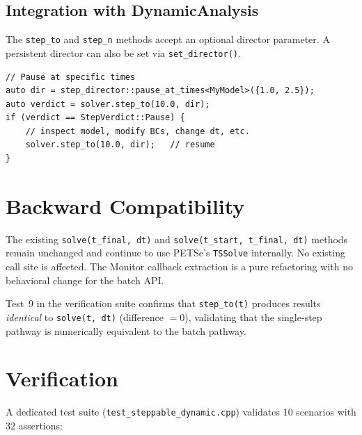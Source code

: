 \subsection{Integration with DynamicAnalysis}

The \texttt{step\_to} and \texttt{step\_n} methods accept an optional
director parameter.  A persistent director can also be set via
\texttt{set\_director()}.

\begin{lstlisting}
// Pause at specific times
auto dir = step_director::pause_at_times<MyModel>({1.0, 2.5});
auto verdict = solver.step_to(10.0, dir);
if (verdict == StepVerdict::Pause) {
    // inspect model, modify BCs, change dt, etc.
    solver.step_to(10.0, dir);   // resume
}
\end{lstlisting}

\section{Backward Compatibility}
\label{sec:sd-backward}

The existing \texttt{solve(t\_final, dt)} and
\texttt{solve(t\_start, t\_final, dt)} methods remain unchanged and
continue to use PETSc's \texttt{TSSolve} internally.  No existing
call site is affected.  The Monitor callback extraction is a pure
refactoring with no behavioral change for the batch API.

Test~9 in the verification suite confirms that \texttt{step\_to(t)}
produces results \emph{identical} to \texttt{solve(t, dt)} (difference
$= 0$), validating that the single-step pathway is numerically
equivalent to the batch pathway.

\section{Verification}
\label{sec:sd-verification}

A dedicated test suite (\texttt{test\_steppable\_dynamic.cpp}) validates
10 scenarios with 32 assertions:

